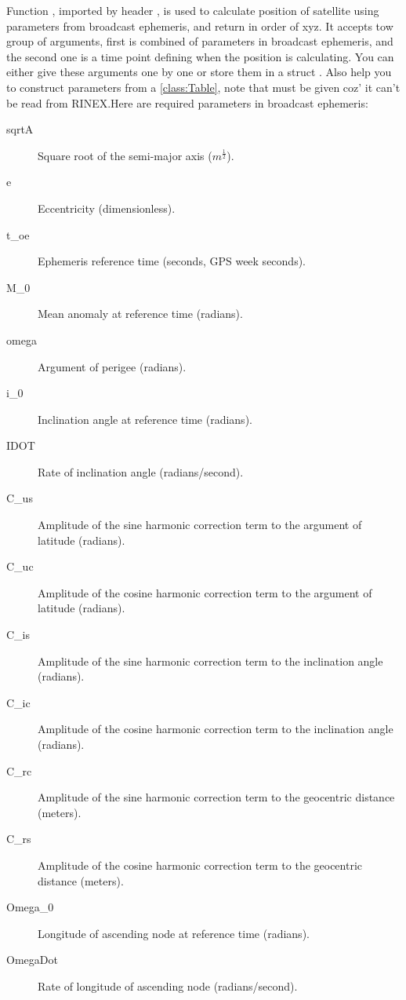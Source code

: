 \documentclass[9pt,a4paper,onecolumn,oneside]{rho-class/rho}
\newcommand{\classref}[1]{\ref{class:#1}}
\begin{document}
Function , imported by header , is used to calculate position of satellite using parameters from broadcast ephemeris, and return in order of xyz. It accepts tow group of arguments, first is combined of parameters in broadcast ephemeris, and the second one is a time point  defining when the position is calculating. You can either give these arguments one by one or store them in a struct . Also  help you to construct parameters from a \classref{Table}, note that  must be given coz' it can't be read from RINEX.Here are required parameters in broadcast ephemeris:
\begin{description}
    \item[sqrtA] Square root of the semi-major axis (\(m^\frac{1}{2}\)).
    \item[e] Eccentricity (dimensionless).
    \item[t\_oe] Ephemeris reference time (seconds, GPS week seconds).
    \item[M\_0] Mean anomaly at reference time (radians).
    \item[omega] Argument of perigee (radians).
    \item[i\_0] Inclination angle at reference time (radians).
    \item[IDOT] Rate of inclination angle (radians/second).
    \item[C\_us] Amplitude of the sine harmonic correction term to the argument of latitude (radians).
    \item[C\_uc] Amplitude of the cosine harmonic correction term to the argument of latitude (radians).
    \item[C\_is] Amplitude of the sine harmonic correction term to the inclination angle (radians).
    \item[C\_ic] Amplitude of the cosine harmonic correction term to the inclination angle (radians).
    \item[C\_rc] Amplitude of the sine harmonic correction term to the geocentric distance (meters).
    \item[C\_rs] Amplitude of the cosine harmonic correction term to the geocentric distance (meters).
    \item[Omega\_0] Longitude of ascending node at reference time (radians).
    \item[OmegaDot] Rate of longitude of ascending node (radians/second).
\end{description}
\end{document}
